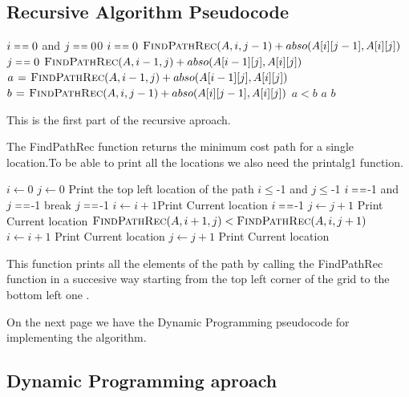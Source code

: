 \documentclass{article}
\begin{document}
\subsection{Recursive Algorithm Pseudocode}
\Large
\begin{codebox}
\li     \If $i \isequal 0$   and  $j \isequal 0$\li      \Then   \Return $0$        
\End
\li     \If $i \isequal 0$ \li     
\Then   \Return $\textnormal{\scshape FindPathRec}(A,i,j-1)+abso(A[i][j-1],A[i][j])$         
\End
\li     \If $j \isequal 0$ \li     
\Then   \Return $\textnormal{\scshape FindPathRec}(A,i-1,j)+abso(A[i-1][j],A[i][j])$          
\End
\li
$a \mathrel{\hspace{1pt}=\hspace{1pt}} \textnormal{\scshape FindPathRec}(A,i-1,j)+abso(A[i-1][j],A[i][j]) $
\li
$b \mathrel{\hspace{1pt}=\hspace{1pt}} \textnormal{\scshape FindPathRec}(A,i,j-1)+abso(A[i][j-1],A[i][j]) $
\li     \If $a <  b$ \li     
\Then   \Return $a$ \li
        \Else \li \Return $b$ 
\End


\end{codebox}
 \vspace*{1cm}
\par This is the first part of the recursive aproach.\par The FindPathRec function 
returns the minimum cost path for a single location.To be able to print all the
locations we also need the printalg1 function.
\newpage
\begin{codebox}
\li $i \gets 0$
\li $j \gets 0$
\li Print the top left location of the path
\li
\While $i \le $-1$ $ and $j \le $-1$ $\Do\li
 \If $i \isequal $-1$ $  and  $j \isequal $-1$ $      \Then \li break\End
 \li\If $j \isequal $-1$  $ 
 \Then \li $i \gets i+1$\li Print Current location  
 \li \ElseIf $i \isequal $-1$ $ \Then \li 
 $ j \gets j+1$ \li Print Current location
 \li \ElseIf $ \textnormal{\scshape FindPathRec}(A,i+1,j) <  \textnormal{\scshape FindPathRec}(A,i,j+1) $ \Then \li 
 $ i \gets i+1$ \li Print Current location\li 
 \Else \Then \li $ j \gets j+1$ \li Print Current location
 
\end{codebox}
\par This function  prints all the elements of the path by calling the FindPathRec function in a succesive way starting from the top left corner of the grid to the bottom left one .
\\
\par On the next page we have the Dynamic Programming pseudocode for implementing the algorithm.
\subsection{Dynamic Programming aproach}
\newpage
\end{document}
